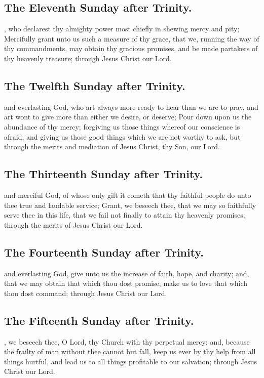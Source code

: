 \subsection{The Eleventh Sunday after Trinity.}
, who declarest thy almighty power most chiefly in shewing mercy and pity; Mercifully grant unto us such a measure of thy grace, that we, running the way of thy commandments, may obtain thy gracious promises, and be made partakers of thy heavenly treasure; through Jesus Christ our Lord.

\subsection{The Twelfth Sunday after Trinity.}
 and everlasting God, who art always more ready to hear than we are to pray, and art wont to give more than either we desire, or deserve; Pour down upon us the abundance of thy mercy; forgiving us those things whereof our conscience is afraid, and giving us those good things which we are not worthy to ask, but through the merits and mediation of Jesus Christ, thy Son, our Lord.

\subsection{The Thirteenth Sunday after Trinity.}
 and merciful God, of whose only gift it cometh that thy faithful people do unto thee true and laudable service; Grant, we beseech thee, that we may so faithfully serve thee in this life, that we fail not finally to attain thy heavenly promises; through the merits of Jesus Christ our Lord.

\subsection{The Fourteenth Sunday after Trinity.}
 and everlasting God, give unto us the increase of faith, hope, and charity; and, that we may obtain that which thou dost promise, make us to love that which thou dost command; through Jesus Christ our Lord.

\subsection{The Fifteenth Sunday after Trinity.}
, we beseech thee, O Lord, thy Church with thy perpetual mercy: and, because the frailty of man without thee cannot but fall, keep us ever by thy help from all things hurtful, and lead us to all things profitable to our salvation; through Jesus Christ our Lord.

